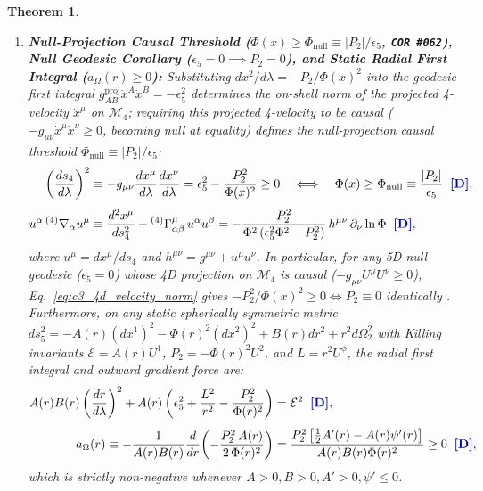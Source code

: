 \documentclass[11pt,a4paper]{article}
\newcommand{\catD}{\text{\textbf{\textcolor{blue!75!black}{[D]}}}}
\theoremstyle{definition}
\theoremstyle{plain}
\newtheorem{theorem}[axiom]{Theorem}
\theoremstyle{remark}
\begin{document}
\begin{theorem}
\begin{enumerate}[label=(\roman*)]
  \item \textbf{Null-Projection Causal Threshold ($\Phi(x) \ge \Phi_{\mathrm{null}} \equiv |P_2|/\epsilon_5$, \texttt{COR~\#062}), Null Geodesic Corollary ($\epsilon_5 = 0 \implies P_2 = 0$), and Static Radial First Integral ($a_\Omega(r) \ge 0$):}
  Substituting $dx^2/d\lambda = -P_2/\Phi(x)^2$ into the geodesic first integral $g_{AB}^{\mathrm{proj}}\dot{x}^A\dot{x}^B = -\epsilon_5^2$ determines the on-shell norm of the projected 4-velocity $\dot{x}^\mu$ on $\mathcal{M}_4$; requiring this projected 4-velocity to be causal ($-g_{\mu\nu}\dot{x}^\mu\dot{x}^\nu \ge 0$, becoming null at equality) defines the null-projection causal threshold $\Phi_{\mathrm{null}} \equiv |P_2|/\epsilon_5$:
  \begin{align}
  \left(\frac{ds_4}{d\lambda}\right)^2 &\equiv -g_{\mu\nu}\frac{dx^\mu}{d\lambda}\frac{dx^\nu}{d\lambda} = \epsilon_5^2 - \frac{P_2^2}{\Phi(x)^2} \ge 0 \quad \Longleftrightarrow \quad \Phi(x) \ge \Phi_{\mathrm{null}} \equiv \frac{|P_2|}{\epsilon_5} \;\;\catD, \label{eq:c3_4d_velocity_norm} \\[4pt]
  u^\alpha\,{}^{(4)}\nabla_\alpha u^\mu &\equiv \frac{d^2 x^\mu}{ds_4^2} + {}^{(4)}\Gamma^\mu_{\alpha\beta}\,u^\alpha u^\beta = -\frac{P_2^2}{\Phi^2\left(\epsilon_5^2\Phi^2 - P_2^2\right)}\,h^{\mu\nu}\,\partial_\nu\ln\Phi \;\;\catD, \label{eq:c3_proper_time_geodesic}
  \end{align}
  where $u^\mu = dx^\mu/ds_4$ and $h^{\mu\nu} = g^{\mu\nu} + u^\mu u^\nu$. In particular, for any 5D null geodesic ($\epsilon_5 = 0$) whose 4D projection on $\mathcal{M}_4$ is causal ($-g_{\mu\nu}U^\mu U^\nu \ge 0$), Eq.~\eqref{eq:c3_4d_velocity_norm} gives $-P_2^2/\Phi(x)^2 \ge 0 \Longleftrightarrow P_2 \equiv 0$ identically \catD. Furthermore, on any static spherically symmetric metric $ds_5^2 = -A(r)(dx^1)^2 - \Phi(r)^2(dx^2)^2 + B(r)dr^2 + r^2 d\Omega_2^2$ with Killing invariants $\mathcal{E} = A(r)U^1$, $P_2 = -\Phi(r)^2 U^2$, and $L = r^2 U^\phi$, the radial first integral and outward gradient force are:
  \begin{align}
  A(r)B(r)\left(\frac{dr}{d\lambda}\right)^2 + A(r)\left(\epsilon_5^2 + \frac{L^2}{r^2} - \frac{P_2^2}{\Phi(r)^2}\right) &= \mathcal{E}^2 \;\;\catD, \nonumber \\[4pt]
  a_\Omega(r) \equiv -\frac{1}{A(r)B(r)}\frac{d}{dr}\!\left(-\frac{P_2^2\,A(r)}{2\,\Phi(r)^2}\right) &= \frac{P_2^2\left[\frac{1}{2}A'(r) - A(r)\psi'(r)\right]}{A(r)B(r)\Phi(r)^2} \ge 0 \;\;\catD, \label{eq:c3_radial_first_integral_force}
  \end{align}
  which is strictly non-negative whenever $A > 0, B > 0, A' > 0, \psi' \le 0$.


\end{enumerate}
\end{theorem}
\end{document}
